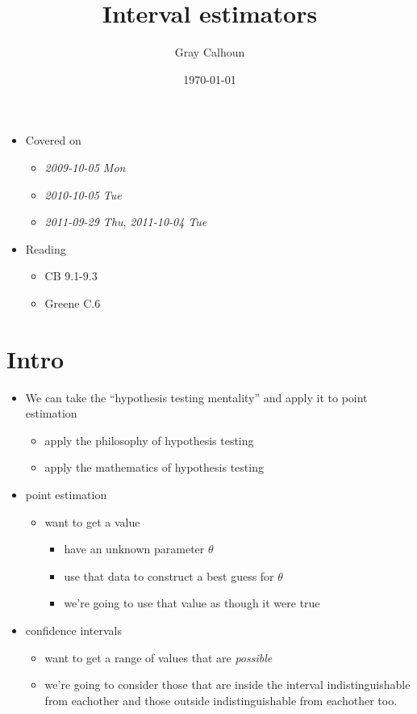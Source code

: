 \documentclass[11pt]{article}
\title{Interval estimators}
\author{Gray Calhoun}
\date{\today}
\begin{document}
\maketitle

\setcounter{tocdepth}{2}
\tableofcontents
\vspace*{1cm}
\begin{itemize}
\item Covered on
\begin{itemize}
\item \textit{2009-10-05 Mon}
\item \textit{2010-10-05 Tue}
\item \textit{2011-09-29 Thu}, \textit{2011-10-04 Tue}
\end{itemize}
\item Reading
\begin{itemize}
\item CB 9.1-9.3
\item Greene C.6
\end{itemize}
\end{itemize}
\section{Intro}
\label{sec-1}

\begin{itemize}
\item We can take the ``hypothesis testing mentality'' and apply it to
      point estimation
\begin{itemize}
\item apply the philosophy of hypothesis testing
\item apply the mathematics of hypothesis testing
\end{itemize}
\item point estimation
\begin{itemize}
\item want to get a value
\begin{itemize}
\item have an unknown parameter $\theta$
\item use that data to construct a best guess for $\theta$
\item we're going to use that value as though it were true
\end{itemize}
\end{itemize}
\item confidence intervals
\begin{itemize}
\item want to get a range of values that are \emph{possible}
\item we're going to consider those that are inside the interval
        indistinguishable from eachother and those outside
        indistinguishable from eachother too.
\end{itemize}
\end{itemize}
\end{document}

